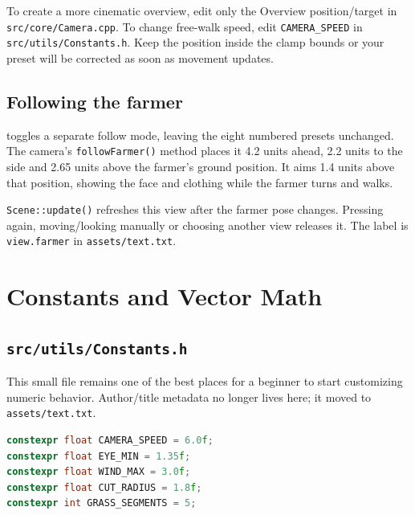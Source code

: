 \documentclass[11pt,a4paper,openany]{book}
\newcommand{\code}[1]{\texttt{#1}}
\newcommand{\file}[1]{\nolinkurl{#1}}
\newcommand{\keycap}[1]{\begingroup\setlength{\fboxsep}{0.8pt}\raisebox{0.05ex}{\fbox{\footnotesize\texttt{#1}}}\endgroup}
\begin{document}
\begin{editbox}
	To create a more cinematic overview, edit only the Overview position/target in \file{src/core/Camera.cpp}. To change free-walk speed, edit \code{CAMERA_SPEED} in \file{src/utils/Constants.h}. Keep the position inside the clamp bounds or your preset will be corrected as soon as movement updates.
\end{editbox}

\section{Following the farmer}
\keycap{J} toggles a separate follow mode, leaving the eight numbered presets unchanged. The camera's \code{followFarmer()} method places it 4.2 units ahead, 2.2 units to the side and 2.65 units above the farmer's ground position. It aims 1.4 units above that position, showing the face and clothing while the farmer turns and walks.

\code{Scene::update()} refreshes this view after the farmer pose changes. Pressing \keycap{J} again, moving/looking manually or choosing another view releases it. The label is \code{view.farmer} in \file{assets/text.txt}.

\chapter{Constants and Vector Math}
\section{\texttt{src/utils/Constants.h}}
This small file remains one of the best places for a beginner to start customizing numeric behavior. Author/title metadata no longer lives here; it moved to \file{assets/text.txt}.
\begin{lstlisting}[language=C++]
constexpr float CAMERA_SPEED = 6.0f;
constexpr float EYE_MIN = 1.35f;
constexpr float WIND_MAX = 3.0f;
constexpr float CUT_RADIUS = 1.8f;
constexpr int GRASS_SEGMENTS = 5;
\end{lstlisting}
\end{document}
